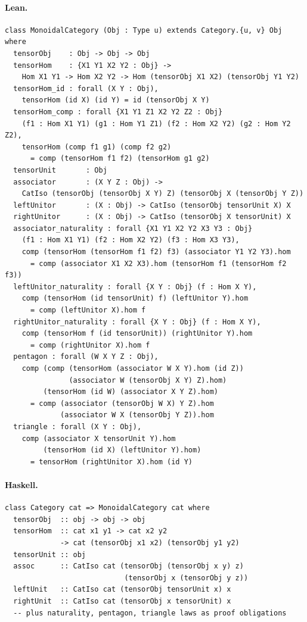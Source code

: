 \documentclass[11pt,a4paper]{article}
\begin{document}
\paragraph{Lean.}
\begin{lstlisting}[style=lean]
class MonoidalCategory (Obj : Type u) extends Category.{u, v} Obj where
  tensorObj    : Obj -> Obj -> Obj
  tensorHom    : {X1 Y1 X2 Y2 : Obj} ->
    Hom X1 Y1 -> Hom X2 Y2 -> Hom (tensorObj X1 X2) (tensorObj Y1 Y2)
  tensorHom_id : forall (X Y : Obj),
    tensorHom (id X) (id Y) = id (tensorObj X Y)
  tensorHom_comp : forall {X1 Y1 Z1 X2 Y2 Z2 : Obj}
    (f1 : Hom X1 Y1) (g1 : Hom Y1 Z1) (f2 : Hom X2 Y2) (g2 : Hom Y2 Z2),
    tensorHom (comp f1 g1) (comp f2 g2)
      = comp (tensorHom f1 f2) (tensorHom g1 g2)
  tensorUnit       : Obj
  associator       : (X Y Z : Obj) ->
    CatIso (tensorObj (tensorObj X Y) Z) (tensorObj X (tensorObj Y Z))
  leftUnitor       : (X : Obj) -> CatIso (tensorObj tensorUnit X) X
  rightUnitor      : (X : Obj) -> CatIso (tensorObj X tensorUnit) X
  associator_naturality : forall {X1 Y1 X2 Y2 X3 Y3 : Obj}
    (f1 : Hom X1 Y1) (f2 : Hom X2 Y2) (f3 : Hom X3 Y3),
    comp (tensorHom (tensorHom f1 f2) f3) (associator Y1 Y2 Y3).hom
      = comp (associator X1 X2 X3).hom (tensorHom f1 (tensorHom f2 f3))
  leftUnitor_naturality : forall {X Y : Obj} (f : Hom X Y),
    comp (tensorHom (id tensorUnit) f) (leftUnitor Y).hom
      = comp (leftUnitor X).hom f
  rightUnitor_naturality : forall {X Y : Obj} (f : Hom X Y),
    comp (tensorHom f (id tensorUnit)) (rightUnitor Y).hom
      = comp (rightUnitor X).hom f
  pentagon : forall (W X Y Z : Obj),
    comp (comp (tensorHom (associator W X Y).hom (id Z))
               (associator W (tensorObj X Y) Z).hom)
         (tensorHom (id W) (associator X Y Z).hom)
      = comp (associator (tensorObj W X) Y Z).hom
             (associator W X (tensorObj Y Z)).hom
  triangle : forall (X Y : Obj),
    comp (associator X tensorUnit Y).hom
         (tensorHom (id X) (leftUnitor Y).hom)
      = tensorHom (rightUnitor X).hom (id Y)
\end{lstlisting}

\paragraph{Haskell.}
\begin{lstlisting}[style=haskell]
class Category cat => MonoidalCategory cat where
  tensorObj  :: obj -> obj -> obj
  tensorHom  :: cat x1 y1 -> cat x2 y2
             -> cat (tensorObj x1 x2) (tensorObj y1 y2)
  tensorUnit :: obj
  assoc      :: CatIso cat (tensorObj (tensorObj x y) z)
                            (tensorObj x (tensorObj y z))
  leftUnit   :: CatIso cat (tensorObj tensorUnit x) x
  rightUnit  :: CatIso cat (tensorObj x tensorUnit) x
  -- plus naturality, pentagon, triangle laws as proof obligations
\end{lstlisting}
\end{document}

